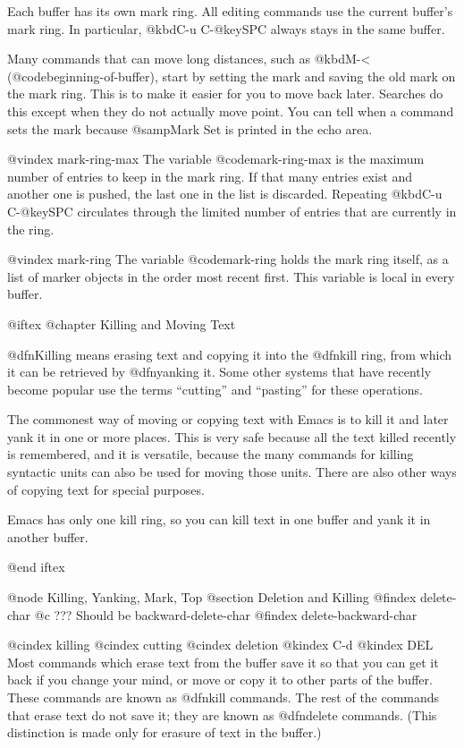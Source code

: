 {{{{{{{  Each buffer has its own mark ring.  All editing commands use the current
buffer's mark ring.  In particular, @kbd{C-u C-@key{SPC}} always stays in
the same buffer.

  Many commands that can move long distances, such as @kbd{M-<}
(@code{beginning-of-buffer}), start by setting the mark and saving the old
mark on the mark ring.  This is to make it easier for you to move back
later.  Searches do this except when they do not actually move point.  You
can tell when a command sets the mark because @samp{Mark Set} is printed in
the echo area.

@vindex mark-ring-max
  The variable @code{mark-ring-max} is the maximum number of entries to
keep in the mark ring.  If that many entries exist and another one is
pushed, the last one in the list is discarded.  Repeating @kbd{C-u
C-@key{SPC}} circulates through the limited number of entries that are
currently in the ring.

@vindex mark-ring
  The variable @code{mark-ring} holds the mark ring itself, as a list of
marker objects in the order most recent first.  This variable is local
in every buffer.

@iftex
@chapter Killing and Moving Text

  @dfn{Killing} means erasing text and copying it into the @dfn{kill ring},
from which it can be retrieved by @dfn{yanking} it.  Some other systems
that have recently become popular use the terms ``cutting'' and ``pasting''
for these operations.

  The commonest way of moving or copying text with Emacs is to kill it and
later yank it in one or more places.  This is very safe because all the
text killed recently is remembered, and it is versatile, because the many
commands for killing syntactic units can also be used for moving those
units.  There are also other ways of copying text for special purposes.

  Emacs has only one kill ring, so you can kill text in one buffer and yank
it in another buffer.

@end iftex

@node Killing, Yanking, Mark, Top
@section Deletion and Killing
@findex delete-char
@c ??? Should be backward-delete-char
@findex delete-backward-char

@cindex killing
@cindex cutting
@cindex deletion
@kindex C-d
@kindex DEL
  Most commands which erase text from the buffer save it so that you can
get it back if you change your mind, or move or copy it to other parts of
the buffer.  These commands are known as @dfn{kill} commands.  The rest of
the commands that erase text do not save it; they are known as @dfn{delete}
commands.  (This distinction is made only for erasure of text in the
buffer.)

}}}}}}}
